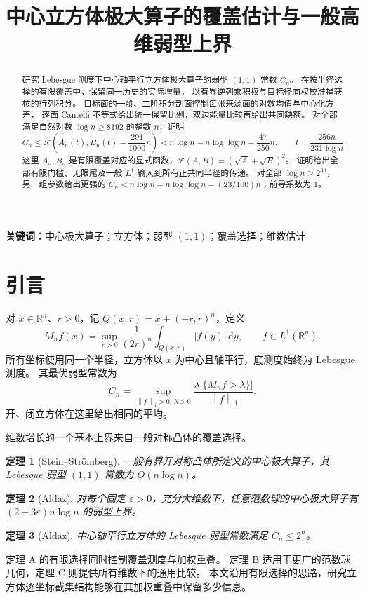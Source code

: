 \documentclass[UTF8,a4paper,11pt,fontset=fandol]{ctexart}
\title{中心立方体极大算子的覆盖估计与一般高维弱型上界}
\author{}\date{}
\newtheorem{known}{定理}
\theoremstyle{remark}
\newcommand{\R}{\mathbb R}
\newcommand{\norm}[1]{\left\lVert#1\right\rVert}
\newcommand{\dint}{\,\mathrm d}
\newcommand{\Fcal}{\mathcal F}
\begin{document}
\maketitle\vspace{-2em}
\begin{abstract}
研究 Lebesgue 测度下中心轴平行立方体极大算子的弱型 $(1,1)$ 常数 $C_n$。
在按半径选择的有限覆盖中，保留同一历史的实际增量，
以有界逆列乘积权与目标径向权校准捕获核的行列积分。
目标面的一阶、二阶积分剖面控制每张来源面的对数均值与中心化方差，
逐面 Cantelli 不等式给出统一保留比例，双边能量比较再给出共同缺额。
对全部满足自然对数 $\log n\ge8192$ 的整数 $n$，证明
\[
 C_n\le\Fcal\!\left(A_n(t),B_n(t)-\frac{291}{1000}n\right)
 <n\log n-n\log\log n-\frac{47}{250}n,
 \qquad t=\frac{256n}{231\log n}.
\]
这里 $A_n,B_n$ 是有限覆盖对应的显式函数，$\Fcal(A,B)=(\sqrt A+\sqrt B)^2$。
证明给出全部有限门槛、无限尾及一般 $L^1$ 输入到所有正共同半径的传递。
对全部 $\log n\ge2^{30}$，另一组参数给出更强的
$C_n<n\log n-n\log\log n-(23/100)n$；前导系数为 $1$。
\end{abstract}
\noindent\textbf{关键词：}中心极大算子；立方体；弱型 $(1,1)$；覆盖选择；维数估计

\section{引言}
对 $x\in\R^n$、$r>0$，记 $Q(x,r)=x+(-r,r)^n$，定义
\begin{equation}\label{eq:maximal}
 M_nf(x)=\sup_{r>0}\frac1{(2r)^n}\int_{Q(x,r)}|f(y)|\dint y,
 \qquad f\in L^1(\R^n).
\end{equation}
所有坐标使用同一个半径，立方体以 $x$ 为中心且轴平行，底测度始终为 Lebesgue 测度。
其最优弱型常数为
\begin{equation}\label{eq:constant}
 C_n=\sup_{\norm f_1>0,\,\lambda>0}
 \frac{\lambda|\{M_nf>\lambda\}|}{\norm f_1}.
\end{equation}
开、闭立方体在这里给出相同的平均。

维数增长的一个基本上界来自一般对称凸体的覆盖选择。
\begin{known}[Stein--Str\"omberg]\label{known:SS}
一般有界开对称凸体所定义的中心极大算子，其 Lebesgue 弱型 $(1,1)$ 常数为
$O(n\log n)$。\cite[第2节，第260--263页]{SS83}
\end{known}
\begin{known}[Aldaz]\label{known:aldaz}
对每个固定 $\varepsilon>0$，充分大维数下，任意范数球的中心极大算子有
$(2+3\varepsilon)n\log n$ 的弱型上界。\cite[定理5.2]{Aldaz17}
\end{known}
\begin{known}[Aldaz]\label{known:generic}
中心轴平行立方体的 Lebesgue 弱型常数满足 $C_n\le2^n$。
\cite[推论3.5]{Aldaz20}
\end{known}
定理 A 的有限选择同时控制覆盖测度与加权重叠。
定理 B 适用于更广的范数球几何，定理 C 则提供所有维数下的通用比较。
本文沿用有限选择的思路，研究立方体逐坐标截集结构能够在其加权重叠中保留多少信息。
\end{document}
